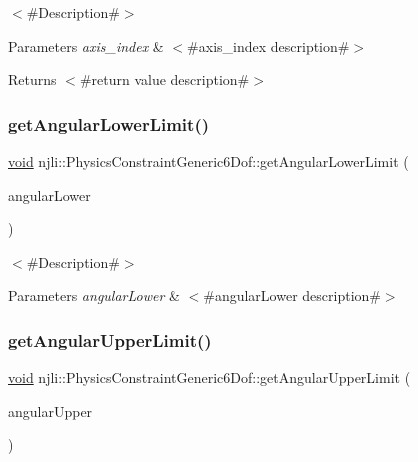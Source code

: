 $<$\#\+Description\#$>$


\begin{DoxyParams}{Parameters}
{\em axis\+\_\+index} & $<$\#axis\+\_\+index description\#$>$\\
\hline
\end{DoxyParams}
\begin{DoxyReturn}{Returns}
$<$\#return value description\#$>$ 
\end{DoxyReturn}
\mbox{\label{classnjli_1_1_physics_constraint_generic6_dof_a8bcad5d1bb5a9a207b69197f2a9f3b17}} 
\subsubsection{\texorpdfstring{get\+Angular\+Lower\+Limit()}{getAngularLowerLimit()}}
{\footnotesize\ttfamily \mbox{\hyperlink{_thread_8h_af1e856da2e658414cb2456cb6f7ebc66}{void}} njli\+::\+Physics\+Constraint\+Generic6\+Dof\+::get\+Angular\+Lower\+Limit (\begin{DoxyParamCaption}\item[{bt\+Vector3 \&}]{angular\+Lower }\end{DoxyParamCaption})}

$<$\#\+Description\#$>$


\begin{DoxyParams}{Parameters}
{\em angular\+Lower} & $<$\#angular\+Lower description\#$>$ \\
\hline
\end{DoxyParams}
\mbox{\label{classnjli_1_1_physics_constraint_generic6_dof_ac2d82f1fc8c0e094c62eaac8c46fae8e}} 
\subsubsection{\texorpdfstring{get\+Angular\+Upper\+Limit()}{getAngularUpperLimit()}}
{\footnotesize\ttfamily \mbox{\hyperlink{_thread_8h_af1e856da2e658414cb2456cb6f7ebc66}{void}} njli\+::\+Physics\+Constraint\+Generic6\+Dof\+::get\+Angular\+Upper\+Limit (\begin{DoxyParamCaption}\item[{bt\+Vector3 \&}]{angular\+Upper }\end{DoxyParamCaption})}

